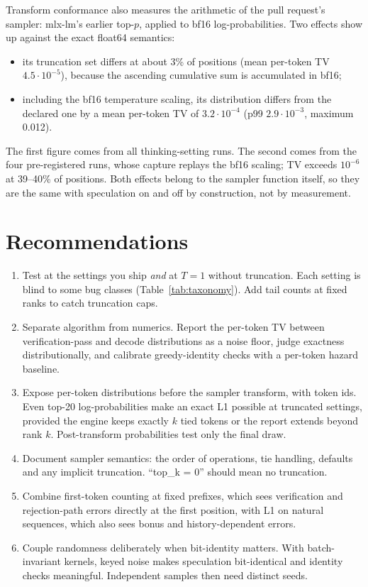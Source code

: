 \documentclass[10pt]{article}
\theoremstyle{remark}
\begin{document}
Transform conformance also measures the arithmetic of the pull request's sampler: mlx-lm's earlier top-$p$, applied to bf16 log-probabilities. Two effects show up against the exact float64 semantics:
\begin{itemize}
\item its truncation set differs at about 3\% of positions (mean per-token TV $4.5\cdot10^{-5}$), because the ascending cumulative sum is accumulated in bf16;
\item including the bf16 temperature scaling, its distribution differs from the declared one by a mean per-token TV of $3.2\cdot10^{-4}$ (p99 $2.9\cdot10^{-3}$, maximum 0.012).
\end{itemize}
The first figure comes from all thinking-setting runs. The second comes from the four pre-registered runs, whose capture replays the bf16 scaling; TV exceeds $10^{-6}$ at 39--40\% of positions. Both effects belong to the sampler function itself, so they are the same with speculation on and off by construction, not by measurement.

\section{Recommendations}
\begin{enumerate}
\item Test at the settings you ship \emph{and} at $T{=}1$ without truncation. Each setting is blind to some bug classes (Table~\ref{tab:taxonomy}). Add tail counts at fixed ranks to catch truncation caps.
\item Separate algorithm from numerics. Report the per-token TV between verification-pass and decode distributions as a noise floor, judge exactness distributionally, and calibrate greedy-identity checks with a per-token hazard baseline.
\item Expose per-token distributions before the sampler transform, with token ids. Even top-20 log-probabilities make an exact L1 possible at truncated settings, provided the engine keeps exactly $k$ tied tokens or the report extends beyond rank $k$. Post-transform probabilities test only the final draw.
\item Document sampler semantics: the order of operations, tie handling, defaults and any implicit truncation. ``top\_k = 0'' should mean no truncation.
\item Combine first-token counting at fixed prefixes, which sees verification and rejection-path errors directly at the first position, with L1 on natural sequences, which also sees bonus and history-dependent errors.
\item Couple randomness deliberately when bit-identity matters. With batch-invariant kernels, keyed noise \cite{daliri2024} makes speculation bit-identical and identity checks meaningful. Independent samples then need distinct seeds.
\end{enumerate}
\end{document}
